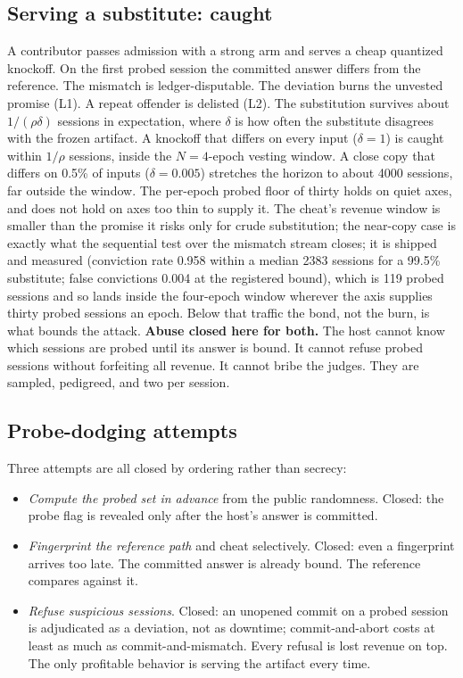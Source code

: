 \documentclass[11pt]{article}
\begin{document}
\subsection{Serving a substitute: caught}

A contributor passes admission with a strong arm and serves a
cheap quantized knockoff. On the first probed session the
committed answer differs from the reference. The mismatch is
ledger-disputable. The deviation burns the unvested promise (L1).
A repeat offender is delisted (L2). The substitution survives
about $1/(\rho\delta)$ sessions in expectation, where $\delta$ is
how often the substitute disagrees with the frozen artifact. A
knockoff that differs on every input ($\delta = 1$) is caught
within $1/\rho$ sessions, inside the $N=4$-epoch vesting window.
A close copy that differs on 0.5\% of inputs ($\delta = 0.005$)
stretches the horizon to about 4000 sessions, far outside the
window. The per-epoch probed floor of thirty holds on
quiet axes, and does not hold on axes too thin to supply it.
The cheat's revenue window is smaller than the
promise it risks only for crude substitution; the near-copy case
is exactly what the sequential test over the mismatch stream
closes; it is shipped and measured (conviction rate 0.958 within a
median 2383 sessions for a 99.5\% substitute; false convictions
0.004 at the registered bound), which is 119 probed sessions and
so lands inside the four-epoch window wherever the axis supplies
thirty probed sessions an epoch. Below that traffic the bond,
not the burn, is what bounds the attack.
\textbf{Abuse closed
    here for both.} The host cannot
know which sessions are probed until its answer is bound. It
cannot refuse probed sessions without forfeiting all revenue. It
cannot bribe the judges. They are sampled, pedigreed, and two per
session.

\subsection{Probe-dodging attempts}

Three attempts are all closed by ordering rather than
secrecy:
\begin{itemize}
    \item \emph{Compute the probed set in advance} from the public
          randomness. Closed: the probe flag is revealed only after the
          host's answer is committed.
    \item \emph{Fingerprint the reference path} and cheat
          selectively. Closed: even a fingerprint arrives too late. The
          committed answer is already bound. The reference compares against
          it.
    \item \emph{Refuse suspicious sessions}. Closed: an unopened
          commit on a probed session is adjudicated as a deviation, not as
          downtime; commit-and-abort costs at least as much as
          commit-and-mismatch. Every refusal is lost revenue on top. The
          only profitable behavior is serving the artifact every time.
\end{itemize}
\end{document}
